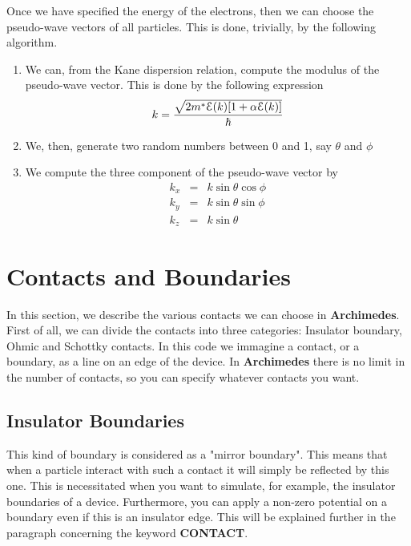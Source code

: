 \documentclass[12pt]{book}
\begin{document}
Once we have specified the energy of the electrons, then we can choose the pseudo-wave vectors of all particles. This is done, trivially, by the following algorithm.
\begin{enumerate}
\item
We can, from the Kane dispersion relation, compute the modulus of the pseudo-wave vector. This is done by the following expression
$$ k = \frac{\sqrt{2 m^* {\cal{E}}(k) [1 + \alpha {\cal{E}}(k)]}}{\hbar} $$

\item
We, then, generate two random numbers between 0 and 1, say $\theta$ and $\phi$ 

\item
We compute the three component of the pseudo-wave vector by
\begin{eqnarray}
 k_x &=& k \sin{\theta} \cos{\phi} \\
 k_y &=& k \sin{\theta} \sin{\phi} \\
 k_z &=& k \sin{\theta} 
\end{eqnarray}

\end{enumerate}

\section{Contacts and Boundaries}

In this section, we describe the various contacts we can choose in \textbf{Archimedes}. First of all, we can divide the contacts into three categories: Insulator boundary, Ohmic and Schottky contacts. In this code we immagine a contact, or a boundary, as a line on an edge of the device. In \textbf{Archimedes} there is no limit in the number of contacts, so you can specify whatever contacts you want.

\subsection{Insulator Boundaries}

This kind of boundary is considered as a "mirror boundary". This means that when a particle interact with such a contact it will simply be reflected by this one. This is necessitated when you want to simulate, for example, the insulator boundaries of a device. Furthermore, you can apply a non-zero potential on a boundary even if this is an insulator edge. This will be explained further in the paragraph concerning the keyword \textbf{CONTACT}.
\end{document}
